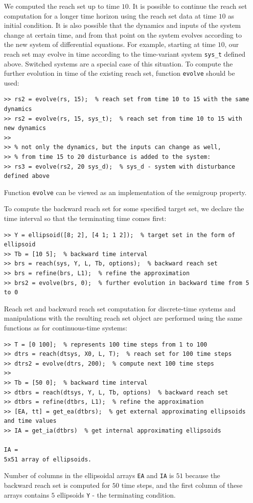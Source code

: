 \documentclass{report}
\begin{document}
We computed the reach set up to time $10$. It is possible to continue
the reach set computation for a longer time horizon using the reach set
data at time $10$ as initial condition.
It is also possible that the dynamics and inputs of the system change at
certain time, and from that point on the system evolves according to the new
system of differential equations. For example, starting at time $10$, our
reach set may evolve in time according to the time-variant system {\tt sys\_t}
defined above. Switched systems are a special case of this situation.
To compute the further evolution in time of the existing reach set,
function {\tt evolve} should be used:
{\tt \begin{verbatim}
>> rs2 = evolve(rs, 15);  % reach set from time 10 to 15 with the same dynamics
>> rs2 = evolve(rs, 15, sys_t);  % reach set from time 10 to 15 with new dynamics
>>
>> % not only the dynamics, but the inputs can change as well,
>> % from time 15 to 20 disturbance is added to the system:
>> rs3 = evolve(rs2, 20 sys_d);  % sys_d - system with disturbance defined above
\end{verbatim} }
Function {\tt evolve} can be viewed as an implementation of the semigroup
property.

To compute the backward reach set for some specified target set,
we declare the time interval so that the terminating time comes first:
{\tt \begin{verbatim}
>> Y = ellipsoid([8; 2], [4 1; 1 2]);  % target set in the form of ellipsoid
>> Tb = [10 5];  % backward time interval
>> brs = reach(sys, Y, L, Tb, options);  % backward reach set
>> brs = refine(brs, L1);  % refine the approximation
>> brs2 = evolve(brs, 0);  % further evolution in backward time from 5 to 0
\end{verbatim} }
Reach set and backward reach set computation for discrete-time systems and
manipulations with the resulting reach set object are performed using
the same functions as for continuous-time systems:
{\tt \begin{verbatim}
>> T = [0 100];  % represents 100 time steps from 1 to 100
>> dtrs = reach(dtsys, X0, L, T);  % reach set for 100 time steps
>> dtrs2 = evolve(dtrs, 200);  % compute next 100 time steps
>>
>> Tb = [50 0];  % backward time interval
>> dtbrs = reach(dtsys, Y, L, Tb, options)  % backward reach set
>> dtbrs = refine(dtbrs, L1);  % refine the approximation
>> [EA, tt] = get_ea(dtbrs);  % get external approximating ellipsoids and time values
>> IA = get_ia(dtbrs)  % get internal approximating ellipsoids

IA =
5x51 array of ellipsoids.
\end{verbatim} }
Number of columns in the ellipsoidal arrays {\tt EA} and {\tt IA} is $51$
because the backward reach set is computed for $50$ time steps, and the first
column of these arrays contains $5$ ellipsoids {\tt Y} - the terminating
condition.
\end{document}

